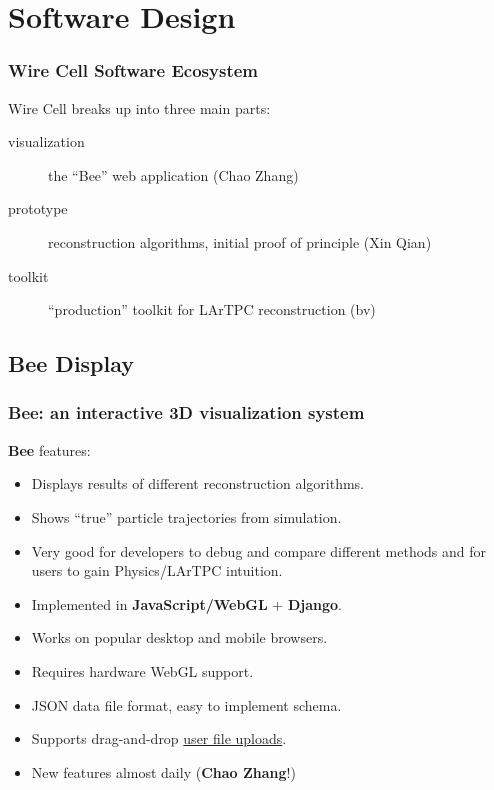 \documentclass[xcolor=dvipsnames]{beamer}
\begin{document}
\section{Software Design}

\begin{frame}
\end{frame}


\begin{frame}
  \frametitle{Wire Cell Software Ecosystem}

  Wire Cell breaks up into three main parts:

  \begin{description}
  \item[visualization] the ``Bee'' web application (Chao Zhang)
  \item[prototype] reconstruction algorithms, initial proof of
    principle (Xin Qian)
  \item[toolkit] ``production'' toolkit for LArTPC reconstruction (bv)
  \end{description}

\end{frame}

\subsection{Bee Display}

\begin{frame}
  \frametitle{Bee: an interactive 3D visualization system}

  \textbf{Bee} features:
  \begin{itemize}
  \item Displays results of different reconstruction algorithms.
  \item Shows ``true'' particle trajectories from simulation.
  \item Very good for developers to debug and compare different
    methods and for users to gain Physics/LArTPC intuition.
  \item Implemented in \textbf{JavaScript/WebGL} + \textbf{Django}.
  \item Works on popular desktop and mobile browsers.
  \item Requires hardware WebGL support.
  \item JSON data file format, easy to implement schema.
  \item Supports drag-and-drop
    \href{http://bnlif.github.io/wire-cell-docs/viz/uploads/}{user
      file uploads}.
  \item New features almost daily (\textbf{Chao Zhang}!)
  \end{itemize}
\end{frame}
\end{document}
